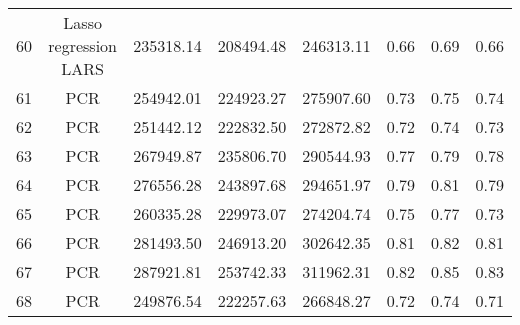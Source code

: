 \begin{tabular}{cccccccc}
  60 & Lasso regression LARS & 235318.14 & 208494.48 & 246313.11 & 0.66 & 0.69 & 0.66 \\ 
  61 & PCR & 254942.01 & 224923.27 & 275907.60 & 0.73 & 0.75 & 0.74 \\ 
  62 & PCR & 251442.12 & 222832.50 & 272872.82 & 0.72 & 0.74 & 0.73 \\ 
  63 & PCR & 267949.87 & 235806.70 & 290544.93 & 0.77 & 0.79 & 0.78 \\ 
  64 & PCR & 276556.28 & 243897.68 & 294651.97 & 0.79 & 0.81 & 0.79 \\ 
  65 & PCR & 260335.28 & 229973.07 & 274204.74 & 0.75 & 0.77 & 0.73 \\ 
  66 & PCR & 281493.50 & 246913.20 & 302642.35 & 0.81 & 0.82 & 0.81 \\ 
  67 & PCR & 287921.81 & 253742.33 & 311962.31 & 0.82 & 0.85 & 0.83 \\ 
  68 & PCR & 249876.54 & 222257.63 & 266848.27 & 0.72 & 0.74 & 0.71 \\ 
   \hline
\end{tabular}
